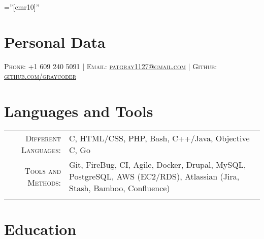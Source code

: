 \documentclass[a4paper,10pt, onepage]{article} %
\begin{document}
\pagestyle{empty} 
\font\fb=''[cmr10]'' %


\par{\par} %
\par{\par}

\section{Personal Data}
\centering\textsc{{Phone:} +1 609 240 5091 | {Email:}  \href{mailto:patgray1127@gmail.com}{patgray1127@gmail.com} | {Github:}  \href{http://github.com/graycoder}{github.com/graycoder}}\\



\section{Languages and Tools}

\begin{tabular}{rp{10cm}}
\textsc{Different Languages:} & C, HTML/CSS, PHP, Bash, C++/Java, Objective C, Go\\
\textsc{Tools and Methods:} & Git, FireBug, CI, Agile, Docker, Drupal, MySQL, PostgreSQL, AWS (EC2/RDS), Atlassian (Jira, Stash, Bamboo, Confluence)\\
\multicolumn{2}{c}{}\\
\end{tabular}


\section{Education}
\end{document}

